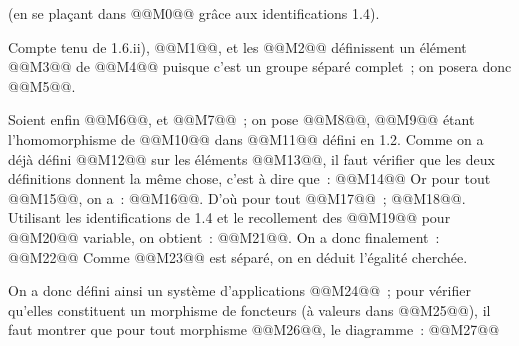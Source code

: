 
(en se plaçant
dans @@M0@@ grâce aux identifications 1.4).

Compte tenu de 1.6.ii), @@M1@@, et les @@M2@@ définissent un élément @@M3@@ de @@M4@@ puisque c'est un groupe séparé complet~; on posera donc @@M5@@.

Soient enfin @@M6@@, et @@M7@@~; on pose @@M8@@, @@M9@@ étant l'homomorphisme de @@M10@@ dans @@M11@@ défini en 1.2. Comme on a déjà défini @@M12@@ sur les éléments @@M13@@, il faut vérifier que les deux définitions donnent la même chose, c'est à dire que~:
@@M14@@
Or pour tout @@M15@@, on a~: @@M16@@. D'où pour tout @@M17@@~; @@M18@@. Utilisant les identifications de 1.4 et le recollement des @@M19@@ pour @@M20@@ variable, on obtient~: @@M21@@.
On a donc finalement~:
@@M22@@
Comme @@M23@@ est séparé, on en déduit l'égalité cherchée.

On a donc défini ainsi un système d'applications @@M24@@~; pour vérifier qu'elles constituent un morphisme de foncteurs (à valeurs dans @@M25@@), il faut montrer que pour tout morphisme @@M26@@, le diagramme~:
@@M27@@
